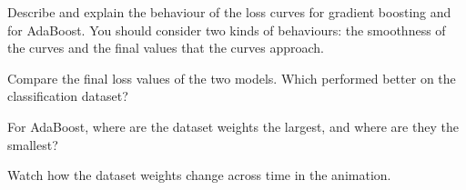\documentclass{article}
\begin{document}
\begin{problem}[2]
    Describe and explain the behaviour of the loss curves for gradient boosting and for AdaBoost. You should consider two kinds of behaviours: the smoothness of the curves and the final values that the curves approach.
\end{problem}
\begin{solution}

\end{solution}

\begin{problem}[2]
    Compare the final loss values of the two models. Which performed better on the classification dataset?
\end{problem}
\begin{solution}

\end{solution}

\begin{problem}[2]
    For AdaBoost, where are the dataset weights the largest, and where are they the smallest?
\end{problem}
\begin{hint}
    Watch how the dataset weights change across time in the animation.
\end{hint}
\begin{solution}

\end{solution}
\end{document}
